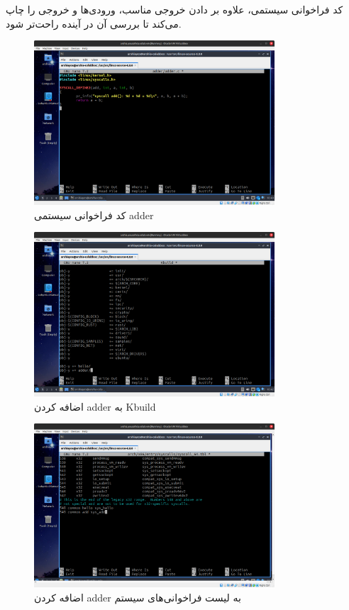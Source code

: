\documentclass[12pt]{article}
\begin{document}
\begin{itemize}
        کد فراخوانی سیستمی، علاوه بر دادن خروجی مناسب، ورودی‌ها و خروجی را چاپ می‌کند تا بررسی آن در آینده راحت‌تر شود.
        
        \begin{figure}[H]
		\centering
		\includegraphics[width=0.8\textwidth]{report2-resources/36.png}
		\caption{کد فراخوانی سیستمی \textenglish{adder}}
	\end{figure}

        \begin{figure}[H]
		\centering
		\includegraphics[width=0.8\textwidth]{report2-resources/37.png}
		\caption{اضافه کردن \textenglish{adder} به \textenglish{Kbuild}}
	\end{figure}

        \begin{figure}[H]
		\centering
		\includegraphics[width=0.8\textwidth]{report2-resources/38.png}
		\caption{اضافه کردن \textenglish{adder} به لیست فراخوانی‌های سیستم}
	\end{figure}


\end{itemize}
\end{document}
